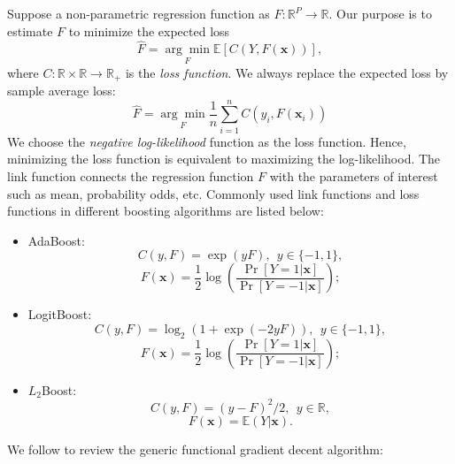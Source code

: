 \documentclass[11pt]{article}
\numberwithin{equation}{section}
\def\R{{\mathbb R}}  %
\def\E{{\mathbb E}}  %
\def\bx{\boldsymbol{x}}
\begin{document}
	Suppose a {non-parametric regression function} as $F:\R^P\rightarrow\R$. Our purpose is to  estimate $F$ to minimize the expected loss $$\hat{F}=\underset{F}{\arg\min}\E\left[C(Y,F(\bx))\right],$$
	where $C:\R\times\R\rightarrow\R_+$ is the \textit{loss function}.
	We always replace the expected loss by sample average loss:
	$$\hat{F}=\underset{F}{\arg\min}\frac{1}{n}\sum_{i=1}^nC(y_i,F(\bx_i))$$
	We choose the \textit{negative log-likelihood} function as the loss function. Hence, minimizing the loss function is equivalent to maximizing the log-likelihood.
The link function connects the regression function $F$ with the parameters of interest such as mean, probability odds, etc. 
	Commonly used {link functions} and loss functions in different boosting algorithms are listed below:
	\begin{itemize}
		\item AdaBoost: $$C(y,F)=\exp(yF),  ~~ y\in\{-1,1\},$$
		$$F(\bx)=\frac{1}{2}\log\left(\frac{\Pr[Y=1|\bx]}{\Pr[Y=-1|\bx]}\right);$$
		\item LogitBoost: $$C(y,F)=\log_2(1+\exp(-2yF)), ~~ y\in\{-1,1\},$$
		$$F(\bx)=\frac{1}{2}\log\left(\frac{\Pr[Y=1|\bx]}{\Pr[Y=-1|\bx]}\right);$$
		\item $L_2$Boost: 
		\begin{equation}\label{l2}
			C(y,F)=(y-F)^2/2, ~~ y\in \R,
		\end{equation}
		$$F(\bx)=\E(Y|\bx).$$
	\end{itemize}

We follow \citet{buehlmann:2003} to review the generic functional gradient decent algorithm:
\end{document}
